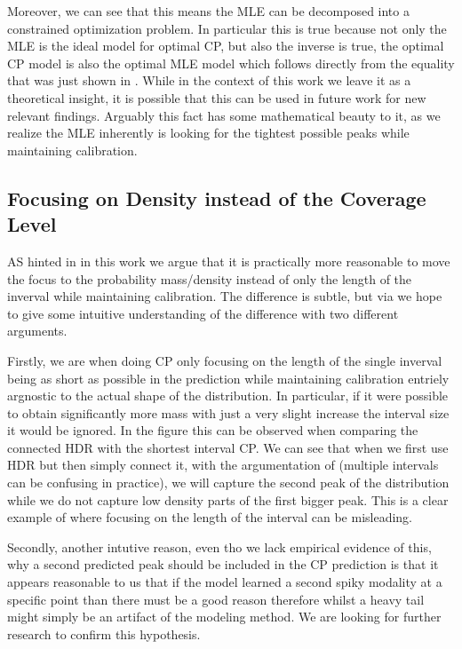 Moreover, we can see that this means the MLE can be decomposed into a constrained optimization problem. In particular this is true because not only the MLE is the ideal model for optimal CP, but also the inverse is true, the optimal CP model is also the optimal MLE model which follows directly from the equality that was just shown in . While in the context of this work we leave it as a theoretical insight, it is possible that this can be used in future work for new relevant findings. Arguably this fact has some mathematical beauty to it, as we realize the MLE inherently is looking for the tightest possible peaks while maintaining calibration. %

\subsection{Focusing on Density instead of the Coverage Level}\label{sec:density_focus}

AS hinted in  in this work we argue that it is practically more reasonable to move the focus to the probability mass/density instead of only the length of the inverval while maintaining calibration. The difference is subtle, but via  we hope to give some intuitive understanding of the difference with two different arguments.

Firstly, we are when doing CP only focusing on the length of the single inverval being as short as possible in the prediction while maintaining calibration entriely argnostic to the actual shape of the distribution. In particular, if it were possible to obtain significantly more mass with just a very slight increase the interval size it would be ignored. In the figure this can be observed when comparing the connected HDR with the shortest interval CP. We can see that when we first use HDR but then simply connect it, with the argumentation of \cite{sesia2021conformal} (multiple intervals can be confusing in practice), we will capture the second peak of the distribution while we do not capture low density parts of the first bigger peak. This is a clear example of where focusing on the length of the interval can be misleading. 

Secondly, another intutive reason, even tho we lack empirical evidence of this, why a second predicted peak should be included in the CP prediction is that it appears reasonable to us that if the model learned a second spiky modality at a specific point than there must be a good reason therefore whilst a heavy tail might simply be an artifact of the modeling method. We are looking for further research to confirm this hypothesis.

